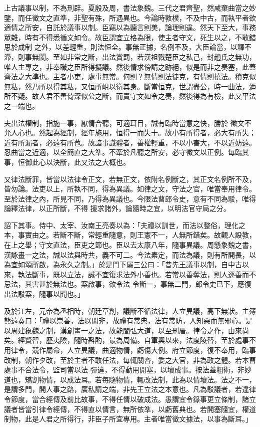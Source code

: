 \begin{pinyinscope}
 上古議事以制，不為刑辟。夏殷及周，書法象魏。三代之君齊聖，然咸棄曲當之妙鑒，而任徵文之直準，非聖有殊，所遇異也。今論時敦樸，不及中古，而執平者欲適情之所安，自託於議事以制。臣竊以為聽言則美，論理則違。然天下至大，事務眾雜，時有不得悉循文如令。故臣謂宜立格為限，使主者守文，死生以之，不敢錯思於成制
 之外，以差輕重，則法恒全。事無正據，名例不及，大臣論當，以釋不滯，則事無閡。至如非常之斷，出法賞罰，若漢祖戮楚臣之私己，封趙氏之無功，唯人主專之，非奉職之臣所得擬議。然後情求傍請之跡絕，似是而非之奏塞，此蓋齊法之大準也。主者小吏，處事無常。何則？無情則法徒克，有情則撓法。積克似無私，然乃所以得其私，又恒所岨以衛其身。斷當恒克，世謂盡公，時一曲法，迺所不疑。故人君不善倚深似公之斷，而責守文如令之奏，然後得為有檢，此又平法之一端也。



 夫出法權制，指施一事，厭情合聽，可適耳目，誠有臨時當意之快，勝於
 徵文不允人心也。然起為經制，經年施用，恒得一而失十。故小有所得者，必大有所失；近有所漏者，必遠有所苞。故諳事識體者，善權輕重，不以小害大，不以近妨遠。忍曲當之近適，以全簡直之大準。不牽於凡聽之所安，必守徵文以正例。每臨其事，恒御此心以決斷，此又法之大概也。



 又律法斷罪，皆當以法律令正文，若無正文，依附名例斷之，其正文名例所不及，皆勿論。法吏以上，所執不同，得為異議。如律之文，守法之官，唯當奉用律令。至於法律之內，所見不同，乃得為異議也。今限法曹郎令史，意有不同為駁，唯得論釋法律，以正所斷，不得
 援求諸外，論隨時之宜，以明法官守局之分。



 詔下其事。侍中、太宰、汝南王亮奏以為：「夫禮以訓世，而法以整俗，理化之本，事實由之。若斷不斷，常輕重隨意，則王憲不一，人無所錯矣。故觀人設教，在上之舉；守文直法，臣吏之節也。臣以去太康八年，隨事異議。周懸象魏之書，漢詠畫一之法，誠以法與時共，義不可二。今法素定，而法為議，則有所開長，以為宜如頌所啟，為永久之制。」於是門下屬三公曰：「昔先王議事以制，自中古以來，執法斷事，既以立法，誠不宜復求法外小善也。若常以善奪法，則人逐善而不忌法，其害甚於無法也。案啟事，欲令法
 令斷一，事無二門，郎令史已下，應復出法駁案，隨事以聞也。」



 及於江左，元帝為丞相時，朝廷草創，議斷不循法律，人立異議，高下無狀。主簿熊遠奏曰：「禮以崇善，法以閑非，故禮有常典，法有常防，人知惡而無邪心。是以周建象魏之制，漢創畫一之法，故能闡弘大道，以至刑厝。律令之作，由來尚矣。經賢智，歷夷險，隨時斟酌，最為周備。自軍興以來，法度陵替，至於處事不用律令，競作屬命，人立異議，曲適物情，虧傷大例。府立節度，復不奉用，臨事改制，朝作夕改，至於主者不敢任法，每輒關咨，委之大官，非為政之體。若本曹處事不合法令，監司當以法
 彈違，不得動用開塞，以壞成事。按法蓋粗術，非妙道也，矯割物情，以成法耳。若每隨物情，輒改法制，此為以情壞法。法之不一，是謂多門，開人事之路，廣私請之端，非先王立法之本意也。凡為駁議者，若違律令節度，當合經傳及前比故事，不得任情以破成法。愚謂宜令錄事更立條制，諸立議者皆當引律令經傳，不得直以情言，無所依準，以虧舊典也。若開塞隨宜，權道制物，此是人君之所得行，非臣子所宜專用。主者唯當徵文據法，以事為斷耳。」




\end{pinyinscope}
